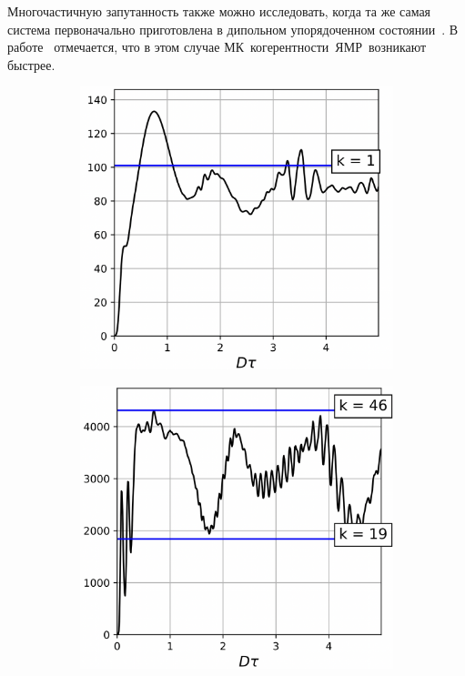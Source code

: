 Многочастичную запутанность также можно исследовать,
когда та же самая система первоначально приготовлена в дипольном упорядоченном состоянии~\cite{Goldman1970}.
В работе~\cite{Doronin2011} отмечается,
что в этом случае МК~когерентности~ЯМР~возникают быстрее.

\begin{figure}[H]
  \centering
  \begin{subfigure}[t]{0.3\textwidth}
    \centering
    \includegraphics[width=\textwidth]{figures/result-nanopore-do-m2-by-time-n101-beta1.png}
    \caption{\protect}
    \label{fig:result-nanopore-do-m2-by-time-n101-beta1}
  \end{subfigure}
  \hfill
  \begin{subfigure}[t]{0.3\textwidth}
    \centering
    \includegraphics[width=\textwidth]{figures/result-nanopore-do-m2-by-time-n101-beta2.png}

\end{subfigure}
\end{figure}
